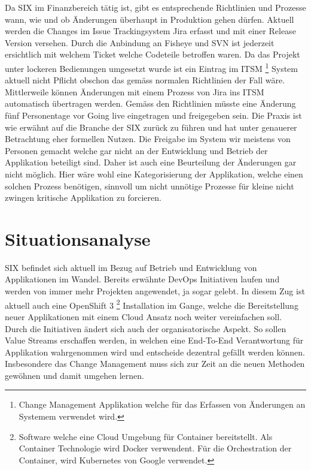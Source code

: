 Da SIX im Finanzbereich tätig ist, gibt es entsprechende Richtlinien und Prozesse wann, wie und ob Änderungen überhaupt in Produktion gehen dürfen. Aktuell werden die Changes im Issue Trackingsystem Jira erfasst und mit einer Release Version versehen. Durch die Anbindung an Fisheye und SVN ist jederzeit ersichtlich mit welchem Ticket welche Codeteile betroffen waren. Da das Projekt unter lockeren Bedienungen umgesetzt wurde ist ein Eintrag im ITSM \footnote{Change Management Applikation welche für das Erfassen von Änderungen an Systemem verwendet wird.} System aktuell nicht Pflicht obschon das gemäss normalen Richtlinien der Fall wäre. Mittlerweile können Änderungen mit einem Prozess von Jira ins ITSM automatisch übertragen werden.
Gemäss den Richtlinien müsste eine Änderung fünf Personentage vor Going live eingetragen und freigegeben sein. Die Praxis ist wie erwähnt auf die Branche der SIX zurück zu führen und hat unter genauerer Betrachtung eher formellen Nutzen. Die Freigabe im System wir meistens von Personen gemacht welche gar nicht an der Entwicklung und Betrieb der Applikation beteiligt sind. Daher ist auch eine Beurteilung der Änderungen gar nicht möglich. Hier wäre wohl eine Kategorisierung der Applikation, welche einen solchen Prozess benötigen, sinnvoll um nicht unnötige Prozesse für kleine nicht zwingen kritische Applikation zu forcieren.

\section{Situationsanalyse}

SIX befindet sich aktuell im Bezug auf Betrieb und Entwicklung von Applikationen im Wandel. Bereits erwähnte DevOps Initiativen laufen und werden von immer mehr Projekten angewendet, ja sogar gelebt. In diesem Zug ist aktuell auch eine OpenShift 3 \footnote{Software welche eine Cloud Umgebung für Container bereitstellt. Als Container Technologie wird Docker verwendent. Für die Orchestration der Container, wird Kubernetes von Google verwendet.} Installation im Gange, welche die Bereitstellung neuer Applikationen mit einem Cloud Ansatz noch weiter vereinfachen soll.
Durch die Initiativen ändert sich auch der organisatorische Aspekt. So sollen Value Streams erschaffen werden, in welchen eine End-To-End Verantwortung für Applikation wahrgenommen wird und entscheide dezentral gefällt werden können. Insbesondere das Change Management muss sich zur Zeit an die neuen Methoden gewöhnen und damit umgehen lernen.

